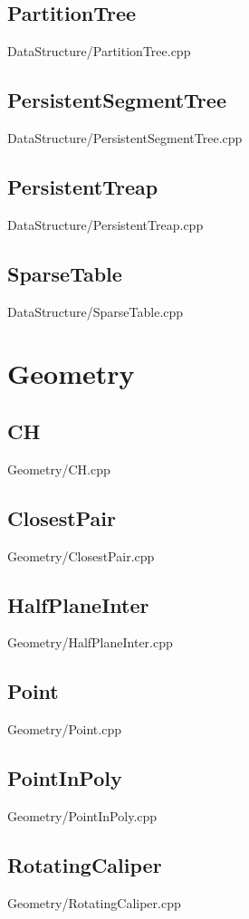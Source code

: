     \subsection{PartitionTree}
         {DataStructure/PartitionTree.cpp}
    \subsection{PersistentSegmentTree}
         {DataStructure/PersistentSegmentTree.cpp}
    \subsection{PersistentTreap}
         {DataStructure/PersistentTreap.cpp}
    \subsection{SparseTable}
         {DataStructure/SparseTable.cpp}

\section{Geometry}
    \subsection{CH}
         {Geometry/CH.cpp}
    \subsection{ClosestPair}
         {Geometry/ClosestPair.cpp}
    \subsection{HalfPlaneInter}
         {Geometry/HalfPlaneInter.cpp}
    \subsection{Point}
         {Geometry/Point.cpp}
    \subsection{PointInPoly}
         {Geometry/PointInPoly.cpp}
    \subsection{RotatingCaliper}
         {Geometry/RotatingCaliper.cpp}
